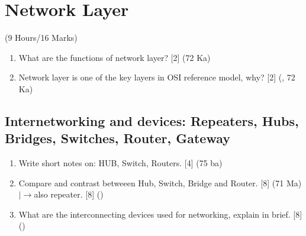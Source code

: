 \documentclass[12pt]{article}
\newcommand{\lb}{\\$\left|\rightarrow\right.$}
\begin{document}
	\pagebreak

\section{Network Layer}
	\begin{center}(9 Hours/16 Marks)\end{center}
	\begin{enumerate}[noitemsep, topsep=0pt]
		\item What are the functions of network layer? \hfill [2] (72 Ka)
		\item Network layer is one of the key layers in OSI reference model, why? \hfill [2] (, 72 Ka)
	\end{enumerate}

	\subsection{Internetworking and devices: Repeaters, Hubs, Bridges, Switches, Router, Gateway}
		\begin{enumerate}[noitemsep, topsep=0pt]
			\item Write short notes on: HUB, Switch, Routers. \hfill [4] (75 ba)

			\item Compare and contrast betweeen Hub, Switch, Bridge and Router. \hfill [8] (71 Ma)
			\lb also repeater. \hfill [8] ()

			\item What are the interconnecting devices used for networking, explain in brief. \hfill [8] ()
		\end{enumerate}
\end{document}

